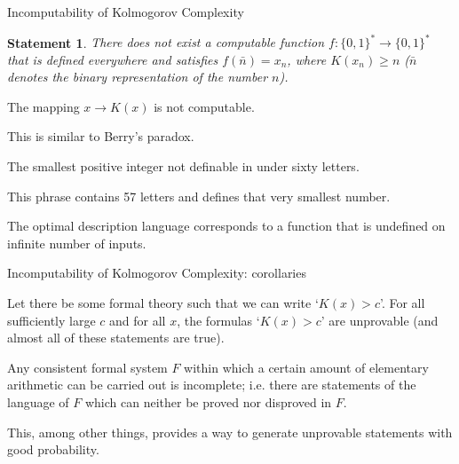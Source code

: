 \documentclass[aspectratio=169]{beamer}
\newtheorem{statement}{Statement}
\newcommand{\bits}{\{0,1\}}
\newcommand{\bitstr}{\bits^*}
\begin{document}
\begin{frame}{Incomputability of Kolmogorov Complexity}
    \begin{statement}
        There does not exist a computable function $f:\bitstr\to\bitstr$ that is
        defined everywhere and satisfies $f(\bar n) = x_n$, where $K(x_n) \ge n$ ($\bar n$ denotes the binary representation of the number $n$).
    \end{statement}
\pause
\begin{corollary}
    The mapping $x \to K(x)$ is not computable.
\end{corollary}
\pause
    This is similar to Berry's paradox.
\begin{center}
    The smallest positive integer not definable in under sixty letters.
\end{center}
This phrase contains 57 letters and defines that very smallest number.
\pause
\begin{corollary}
The optimal description language corresponds to a function that is undefined on infinite number of inputs.
\end{corollary}
\end{frame}

\begin{frame}{Incomputability of Kolmogorov Complexity: corollaries}
\begin{corollary}
    Let there be some formal theory such that we can write `$K(x) > c$'. For all sufficiently large $c$ and for all $x$, the formulas `$K(x) > c$' are unprovable (and almost all of these statements are true).
\end{corollary}

\begin{corollary}
    Any consistent formal system $F$ within which a certain amount of elementary arithmetic can be carried out is incomplete; i.e. there are statements of the language of $F$ which can neither be proved nor disproved in $F$.
\end{corollary}

This, among other things, provides a way to generate unprovable statements with good probability.

\end{frame}
\end{document}
